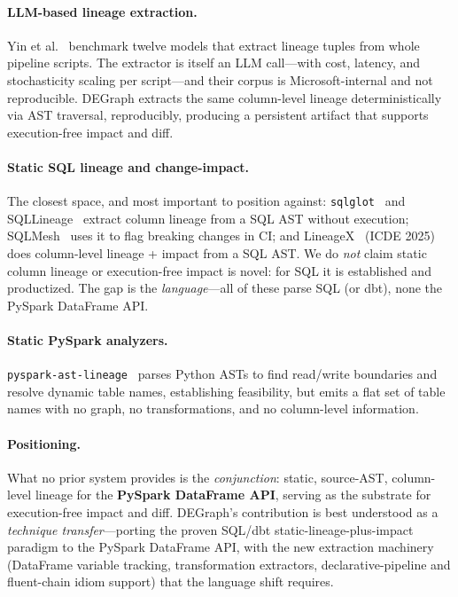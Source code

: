 \documentclass[11pt]{article}
\newcommand{\code}[1]{\texttt{#1}}
\begin{document}
\paragraph{LLM-based lineage extraction.} Yin et al.~\cite{yin} benchmark twelve
models that extract lineage tuples from whole pipeline scripts. The extractor is
itself an LLM call---with cost, latency, and stochasticity scaling per script---and
their corpus is Microsoft-internal and not reproducible. DEGraph extracts the same
column-level lineage deterministically via AST traversal, reproducibly, producing a
persistent artifact that supports execution-free impact and diff.

\paragraph{Static SQL lineage and change-impact.} The closest space, and most
important to position against: \code{sqlglot}~\cite{sqlglot} and
SQLLineage~\cite{sqllineage} extract column lineage from a SQL AST without
execution; SQLMesh~\cite{sqlmesh} uses it to flag breaking changes in CI; and
LineageX~\cite{lineagex} (ICDE 2025) does column-level lineage + impact from a SQL
AST. We do \emph{not} claim static column lineage or execution-free impact is novel:
for SQL it is established and productized. The gap is the \emph{language}---all of
these parse SQL (or dbt), none the PySpark DataFrame API.

\paragraph{Static PySpark analyzers.} \code{pyspark-ast-lineage}~\cite{pyspark}
parses Python ASTs to find read/write boundaries and resolve dynamic table names,
establishing feasibility, but emits a flat set of table names with no graph, no
transformations, and no column-level information.

\paragraph{Positioning.} What no prior system provides is the \emph{conjunction}:
static, source-AST, column-level lineage for the \textbf{PySpark DataFrame API},
serving as the substrate for execution-free impact and diff. DEGraph's contribution
is best understood as a \emph{technique transfer}---porting the proven SQL/dbt
static-lineage-plus-impact paradigm to the PySpark DataFrame API, with the new
extraction machinery (DataFrame variable tracking, transformation extractors,
declarative-pipeline and fluent-chain idiom support) that the language shift
requires.
\end{document}
